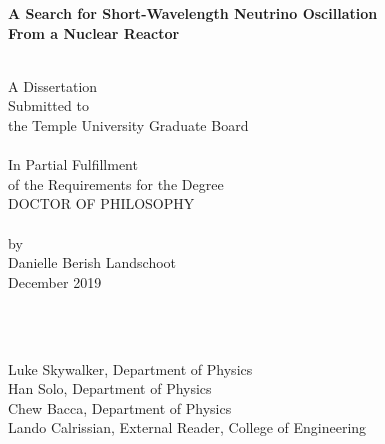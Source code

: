 \begin{titlepage}
	
	\begin{centering} 
		{\bf {\Large A Search for Short-Wavelength Neutrino Oscillation\\ From a Nuclear Reactor}}
		
		\vspace{1cm}
		\noindent\makebox[\linewidth]{\rule{16cm}{0.4pt}} \\ 
		\vspace{1cm}
		A Dissertation                       \\
		Submitted to                         \\
		the Temple University Graduate Board \\
		\vspace{1cm}
		\noindent\makebox[\linewidth]{\rule{16cm}{0.4pt}} \\ 
		\vspace{1cm} 
		In Partial Fulfillment               \\
		of the Requirements for the Degree   \\
		DOCTOR OF PHILOSOPHY                 \\
		\vspace{1cm} 
		\noindent\makebox[\linewidth]{\rule{16cm}{0.4pt}} \\ 
		\vspace{1cm} 
		by                                   \\
		Danielle Berish Landschoot                      \\
		December 2019                            \\
	\end{centering}                      
	
	\vspace{1cm}
	\\
	\vspace{0.20cm}
	
	        \\
	{Luke Skywalker, Department of Physics}                                        \\
	{Han Solo, Department of Physics}                                       \\
	{Chew Bacca, Department of Physics}                                       \\
	{Lando Calrissian, External Reader, College of Engineering}
	
\end{titlepage}
